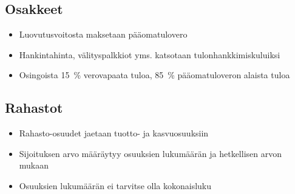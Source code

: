 \documentclass{article}
\begin{document}
\subsection{Osakkeet}\label{osakkeet}
  \begin{itemize}
    \item Luovutusvoitosta maksetaan pääomatulovero
    \item Hankintahinta, välityspalkkiot yms. katsotaan tulonhankkimiskuluiksi
    \item Osingoista 15~\% verovapaata tuloa, 85~\% pääomatuloveron alaista tuloa
  \end{itemize}

\subsection{Rahastot}
  \begin{itemize}
    \item Rahasto-osuudet jaetaan tuotto- ja kasvuosuuksiin
    \item Sijoituksen arvo määräytyy osuuksien lukumäärän ja hetkellisen arvon mukaan
    \item Osuuksien lukumäärän ei tarvitse olla kokonaisluku
  \end{itemize}
\end{document}
